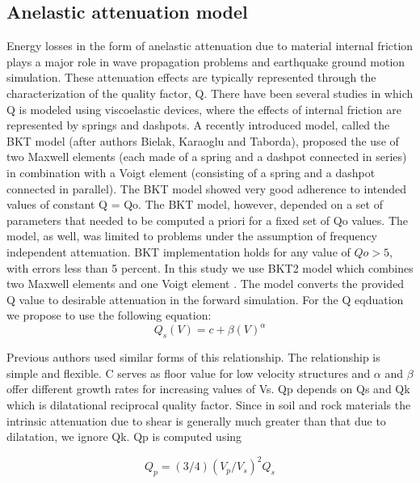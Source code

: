 \subsection{Anelastic attenuation model}

Energy losses in the form of anelastic attenuation due to material internal friction plays a major role in wave propagation problems and earthquake ground motion simulation. These attenuation effects are typically represented through the characterization of the quality factor, Q. There have been several studies in which Q is modeled using viscoelastic devices, where the effects of internal friction are represented by springs and dashpots. A recently introduced model, called the BKT model (after authors Bielak, Karaoglu and Taborda), proposed the use of two Maxwell elements (each made of a spring and a dashpot connected in series) in combination with a Voigt element (consisting of a spring and a dashpot connected in parallel). The BKT model showed very good adherence to intended values of constant Q = Qo. The BKT model, however, depended on a set of parameters that needed to be computed a priori for a fixed set of Qo values. The model, as well, was limited to problems under the assumption of frequency independent attenuation. BKT implementation holds for any value of $Qo > 5$, with errors less than 5 percent. In this study we use BKT2 model which combines two Maxwell elements and one Voigt element \citep{Bielak2011}. The model converts the provided Q value to desirable attenuation in the forward simulation. For the Q eqduation we propose to use the following equation: \\

\begin{equation}
Q_{s}(V) = c + \beta(V)^{\alpha}
\end{equation}

Previous authors used similar forms of this relationship. The relationship is simple and flexible. C serves as floor value for low velocity structures and $\alpha$ and $\beta$ offer different growth rates for increasing values of Vs. Qp depends on Qs and Qk which is dilatational reciprocal quality factor. Since in soil and rock materials the intrinsic attenuation due to shear is generally much greater than that due to dilatation, we ignore Qk. Qp is computed using

\begin{equation}
Q_{p}=(3/4)(V_p/V_{s})^2Q_{s}
\end{equation}

